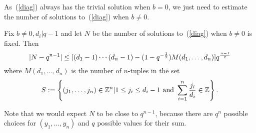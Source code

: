 As~(\ref{diag}) always has the trivial solution when $b=0$, we just need to estimate the number of solutions to~(\ref{diag}) when $b\neq 0$.
\begin{thm}\cite[6.37]{LN}
Fix $b\neq 0, d_i|q-1$ and let $N$ be the number of solutions to~(\ref{diag}) when $b\neq 0$ is fixed. Then
\[
|N-q^{n-1}|\leq [(d_1-1)\cdots (d_n-1)-(1-q^{-\frac{1}{2}})M(d_1,\ldots, d_n)
] q^{\frac{n-1}{2}}\]
where $M(d_1,\ldots, d_n)$ is the number of $n$-tuples in the set
\[S:=\left\{ {(j_1,\ldots, j_n)\in \mathbb{Z}^n|1\leq j_i\leq d_i-1\text{ and }\sum_{i=1}^n \frac{j_i}{d_i}\in \mathbb{Z}} \right\}.\]
\end{thm}
Note that we would expect $N$ to be close to $q^{n-1}$, because there are $q^n$ possible choices for $(y_1,\ldots, y_n)$ and $q$ possible values for their sum.
